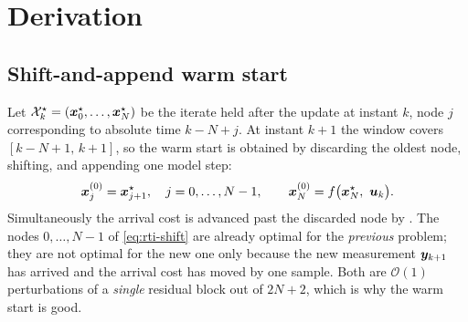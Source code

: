 \section{Derivation}

\subsection{Shift-and-append warm start}
Let $\mathcal{X}^\star_k = (\bm{x}^\star_0,\dots,\bm{x}^\star_N)$ be the iterate held after the update at
instant $k$, node $j$ corresponding to absolute time $k-N+j$.  At instant $k{+}1$ the window covers
$[k-N+1,\,k+1]$, so the warm start is obtained by discarding the oldest node, shifting, and
appending one model step:
\begin{equation}\label{eq:rti-shift}
\bm{x}^{(0)}_j = \bm{x}^\star_{j+1},\quad j = 0,\dots,N-1,
\qquad
\bm{x}^{(0)}_N = f\bigl(\bm{x}^\star_N,\ \bm{u}_k\bigr).
\end{equation}
Simultaneously the arrival cost is advanced past the discarded node by
.  The nodes $0,\dots,N-1$ of \cref{eq:rti-shift} are already
optimal for the \emph{previous} problem; they are not optimal for the new one only because the new
measurement $\bm{y}_{k+1}$ has arrived and the arrival cost has moved by one sample.  Both are
$\mathcal{O}(1)$ perturbations of a \emph{single} residual block out of $2N{+}2$, which is why the
warm start is good.

